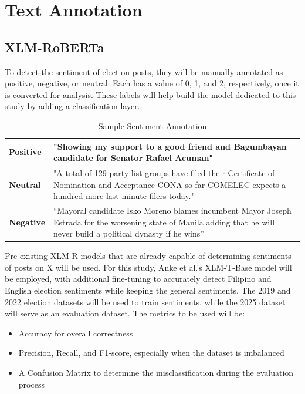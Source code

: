 \section{Text Annotation}
\subsection{XLM-RoBERTa}
To detect the sentiment of election posts, they will be manually annotated as positive, negative, or neutral. Each has a value of 0, 1, and 2, respectively, once it is converted for analysis. These labels will help build the model dedicated to this study by adding a classification layer.

\begin{table}[h]
    \renewcommand{\arraystretch}{1.8}

    \caption{Sample Sentiment Annotation}
    \centering
    \begin{tabularx}{\textwidth}{>{\centering\arraybackslash}p{4cm}|>{\centering\arraybackslash}p{10cm}}
        \textbf{Positive} & "Showing my support to a good friend and Bagumbayan candidate for Senator Rafael Acuman" \\
        \hline
        \textbf{Neutral} & "A total of 129 party-list groups have filed their Certificate of Nomination and Acceptance CONA so far COMELEC expects a hundred more last-minute filers today." \\
        \hline
        \textbf{Negative} & “Mayoral candidate Isko Moreno blames incumbent Mayor Joseph Estrada for the worsening state of Manila adding that he will never build a political dynasty if he wins” \\
    \end{tabularx}
\end{table}

Pre-existing XLM-R models that are already capable of determining sentiments of posts on X will be used. For this study, Anke et al.’s \cite{Barbieri-2022} XLM-T-Base model will be employed, with additional fine-tuning to accurately detect Filipino and English election sentiments while keeping the general sentiments. The 2019 and 2022 election datasets will be used to train sentiments, while the 2025 dataset will serve as an evaluation dataset. The metrics to be used will be:
\begin{itemize}
    \item Accuracy for overall correctness
    \item Precision, Recall, and F1-score, especially when the dataset is imbalanced 
    \item A Confusion Matrix to determine the misclassification during the evaluation process
\end{itemize}

